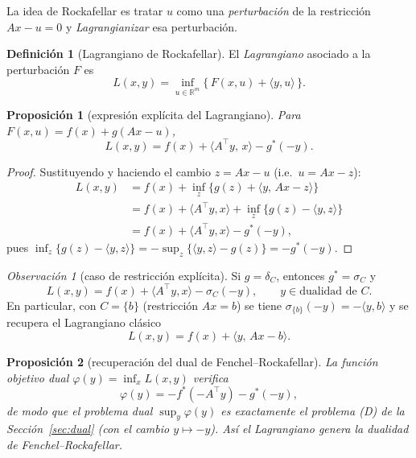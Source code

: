 \documentclass[12pt]{book}
\newcommand{\R}{\mathbb{R}}
\newcommand{\indic}{\delta}
\newcommand{\supp}{\sigma}
\theoremstyle{definition}
\newtheorem{definicion}{Definición}[section]
\theoremstyle{plain}
\newtheorem{proposicion}{Proposición}[section]
\theoremstyle{remark}
\newtheorem{observacion}{Observación}[section]
\begin{document}
La idea de Rockafellar es tratar $u$ como una \emph{perturbación}
de la restricción $Ax-u=0$ y \emph{Lagrangianizar} esa perturbación.

\begin{definicion}[Lagrangiano de Rockafellar]
  El \emph{Lagrangiano} asociado a la perturbación $F$ es
  \[
    \boxed{\;
    L(x,y)=\inf_{u\in\R^m}\bigl\{\, F(x,u)+\langle y,u\rangle\,\bigr\}.
    \;}
  \]
\end{definicion}

\begin{proposicion}[expresión explícita del Lagrangiano]
  Para $F(x,u)=f(x)+g(Ax-u)$,
  \[
    L(x,y)=f(x)+\langle A^{\!\top}y,\,x\rangle - g^*(-y).
  \]
\end{proposicion}

\begin{proof}
  Sustituyendo y haciendo el cambio $z=Ax-u$ (i.e.\ $u=Ax-z$):
  \begin{align*}
    L(x,y)
    &= f(x)+\inf_{z}\bigl\{ g(z) + \langle y,\, Ax-z\rangle \bigr\}\\
    &= f(x)+\langle A^{\!\top}y,x\rangle
       +\inf_{z}\bigl\{ g(z)-\langle y,z\rangle \bigr\}\\
    &= f(x)+\langle A^{\!\top}y,x\rangle - g^*(-y),
  \end{align*}
  pues $\inf_z\{g(z)-\langle y,z\rangle\}=-\sup_z\{\langle y,z\rangle-g(z)\}
  =-g^*(-y)$.
\end{proof}

\begin{observacion}[caso de restricción explícita]
  Si $g=\indic_C$, entonces $g^*=\supp_C$ y
  \[
    L(x,y)=f(x)+\langle A^{\!\top}y,x\rangle-\supp_C(-y),
    \qquad y\in\text{dualidad de }C.
  \]
  En particular, con $C=\{b\}$ (restricción $Ax=b$) se tiene
  $\supp_{\{b\}}(-y)=-\langle y,b\rangle$ y se recupera el
  Lagrangiano clásico
  \[
    L(x,y)=f(x)+\langle y,\, Ax-b\rangle.
  \]
\end{observacion}

\begin{proposicion}[recuperación del dual de Fenchel--Rockafellar]
  La función objetivo dual $\varphi(y)=\inf_x L(x,y)$ verifica
  \[
    \varphi(y)= -f^*(-A^{\!\top}y)-g^*(-y),
  \]
  de modo que el problema dual
  $\sup_y\varphi(y)$ es \emph{exactamente} el problema (D) de la
  Sección~\ref{sec:dual} (con el cambio $y\mapsto -y$).  Así el
  Lagrangiano \emph{genera} la dualidad de Fenchel--Rockafellar.
\end{proposicion}
\end{document}
